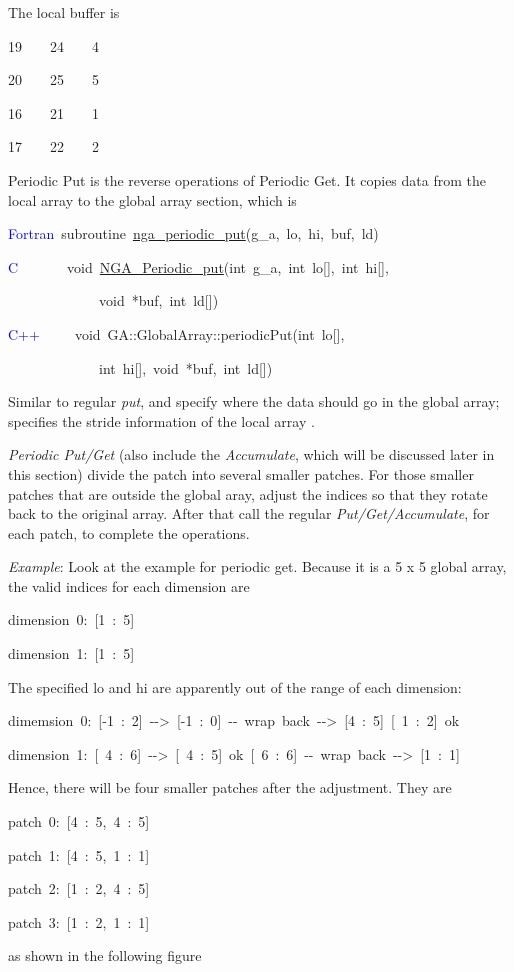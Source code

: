 The local buffer \texttt{} is
\begin{lyxcode}
19~~~~24~~~~4~

20~~~~25~~~~5~~

16~~~~21~~~~1~

17~~~~22~~~~2~
\end{lyxcode}
Periodic Put is the reverse operations of Periodic Get. It copies
data from the local array to the global array section, which is
\begin{lyxcode}
\textcolor{blue}{Fortran}~subroutine~\href{http://www.emsl.pnl.gov/docs/global/ga_ops.html\#ga_periodic_put}{nga\_{}periodic\_{}put}(g\_a,~lo,~hi,~buf,~ld)~

\textcolor{blue}{C}~~~~~~~void~\href{http://www.emsl.pnl.gov/docs/global/c_nga_ops.html\#ga_periodic_put}{NGA\_{}Periodic\_{}put}(int~g\_a,~int~lo{[}{]},~int~hi{[}{]},~

~~~~~~~~~~~~~void~{*}buf,~int~ld{[}{]})~

\textcolor{blue}{C++}~~~~~void~GA::GlobalArray::periodicPut(int~lo{[}{]},~

~~~~~~~~~~~~~int~hi{[}{]},~void~{*}buf,~int~ld{[}{]})
\end{lyxcode}
Similar to regular\emph{ put}, \texttt{} and \texttt{}
specify where the data should go in the global array; \texttt{}
specifies the stride information of the local array \texttt{}.

\emph{Periodic Put/Get} (also include the \emph{Accumulate}, which
will be discussed later in this section) divide the patch into several
smaller patches. For those smaller patches that are outside the global
aray, adjust the indices so that they rotate back to the original
array. After that call the regular \emph{Put/Get/Accumulate}, for
each patch, to complete the operations.

\emph{Example}: Look at the example for periodic get. Because it is
a 5 x 5 global array, the valid indices for each dimension are
\begin{lyxcode}
dimension~0:~{[}1~:~5{]}~

dimension~1:~{[}1~:~5{]}
\end{lyxcode}
The specified lo and hi are apparently out of the range of each dimension:
\begin{lyxcode}
dimemsion~0:~{[}-1~:~2{]}~-{}->~{[}-1~:~0{]}~-{}-~wrap~back~-{}->~{[}4~:~5{]}~{[}~1~:~2{]}~ok

dimension~1:~{[}~4~:~6{]}~-{}->~{[}~4~:~5{]}~ok~{[}~6~:~6{]}~-{}-~wrap~back~-{}->~{[}1~:~1{]}
\end{lyxcode}
Hence, there will be four smaller patches after the adjustment. They
are
\begin{lyxcode}
patch~0:~{[}4~:~5,~4~:~5{]}~

patch~1:~{[}4~:~5,~1~:~1{]}~

patch~2:~{[}1~:~2,~4~:~5{]}~

patch~3:~{[}1~:~2,~1~:~1{]}
\end{lyxcode}
as shown in the following figure

